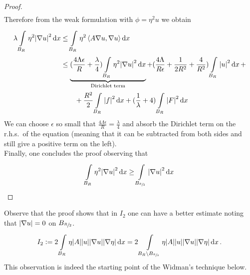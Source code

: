 \begin{proof}
\begin{align}
    \end{align}
    Therefore from the weak formulation with \( \phi = \eta^{2} u\) we obtain
    \begin{align}
        \lambda \int\limits_{B_{R}}^{} \eta^{2}\abs{\nabla u}^{2} \dd{x} &\leq \int\limits_{B_{R}}^{} \eta^{2} \left\langle A \nabla u, \nabla u \right\rangle \dd{x} \\
        &\leq  \underbrace{(\frac{4 \Lambda \epsilon}{R}+ \frac{\lambda}{4}) \int\limits_{B_{R}}^{} \eta^{2}\abs{\nabla u}^{2} \dd{x}}_{\text{Dirichlet term}} + (\frac{4 \Lambda}{R \epsilon}+\frac{1}{2 R^{2}}+\frac{4}{R^{2}}) \int\limits_{B_{R}}^{} \abs{u}^{2} \dd{x} + \\
        &\qquad + \frac{R^{2}}{2} \int\limits_{B_{R}}^{} \abs{f}^{2} \dd{x} + (\frac{1}{\lambda}+4) \int\limits_{B_{R}}^{} \abs{F}^{2} \dd{x}  
    \end{align}
    We can choose \(\epsilon \) so small that \(\frac{4 \Lambda \epsilon}{R} = \frac{\lambda}{4}\) and absorb the Dirichlet term on the r.h.s.\ of the equation (meaning that it can be subtracted from both sides and still give a positive term on the left).\\
    Finally, one concludes the proof observing that
    \begin{gather}
        \int\limits_{B_{R}}^{} \eta^{2}\abs{\nabla u}^{2} \dd{x} \geq \int\limits_{B_{\sfrac{R}{2}}}^{} \abs{\nabla u}^{2} \dd{x}  
    \end{gather}
\end{proof}
Observe that the proof shows that in \(I_{2}\) one can have a better estimate noting that \(\abs{\nabla u}=0\) on \(B_{\sfrac{R}{2}}\).
\begin{gather}
    I_{2}:= 2 \int\limits_{B_{R}}^{} \eta \abs{A} \abs{u}\abs{\nabla u}\abs{\nabla \eta} \dd{x} = 2 \int\limits_{B_{R}\setminus B_{\sfrac{R}{2}}}^{} \eta \abs{A}\abs{u}\abs{\nabla u}\abs{\nabla \eta} \dd{x}.
\end{gather}
This observation is indeed the starting point of the Widman's technique below.

